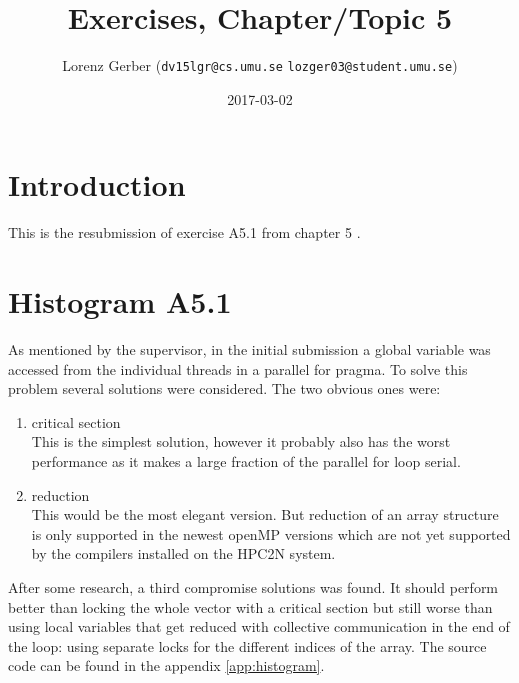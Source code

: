 \documentclass[a4paper,11pt,twoside]{article}
\title{Exercises, Chapter/Topic 5}
\author{Lorenz Gerber ({\tt{dv15lgr@cs.umu.se}} {\tt{lozger03@student.umu.se}})}
\date{2017-03-02}
\begin{document}
\lstset{language=C}
\maketitle
\thispagestyle{empty}
\newpage
\tableofcontents
\thispagestyle{empty}
\newpage

\clearpage
{}

\section{Introduction}
This is the resubmission of exercise A5.1 from chapter 5 \cite[p.267]{pacheco2011}.

\section{Histogram A5.1}
As mentioned by the supervisor, in the initial submission a global variable was accessed from the individual threads in a parallel for pragma. To solve this problem several solutions were considered. The two obvious ones were:

\begin{enumerate}
\item critical section\\
  This is the simplest solution, however it probably also has the worst performance as it makes a large fraction of the parallel for loop serial.
\item reduction\\
  This would be the most elegant version. But reduction of an array structure is only supported in the newest openMP versions which are not yet supported by the compilers installed on the HPC2N system.
\end{enumerate}

After some research, a third compromise solutions was found. It should perform better than locking the whole vector with a critical section but still worse than using local variables that get reduced with collective communication in the end of the loop: using separate locks for the different indices of the array. The source code can be found in the appendix \ref{app:histogram}.


\appendix
\end{document}
